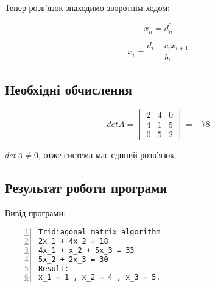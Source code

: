 \documentclass[a4paper, 12pt]{article}
\begin{document}
\newpage
Тепер розв'язок знаходимо зворотнім ходом:

\[
x_n = d_n^\prime
\]

\[
x_i = \frac{d_i - c_ix_{i+1}}{b_i}
\]

\subsection{Необхідні обчислення}

\[
detA = 
\begin{vmatrix}
2 & 4 & 0\\
4 & 1 & 5\\
0 & 5 & 2
\end{vmatrix}
= -78
\]

$det A \neq 0$, отже система має єдиний розв'язок.

\subsection{Результат роботи програми}

Вивід програми:

\begin{Verbatim}[numbers=left,xleftmargin=20mm]
Tridiagonal matrix algorithm
2x_1 + 4x_2 = 18
4x_1 + x_2 + 5x_3 = 33
5x_2 + 2x_3 = 30
Result:
x_1 = 1 , x_2 = 4 , x_3 = 5.
\end{Verbatim}
\end{document}
